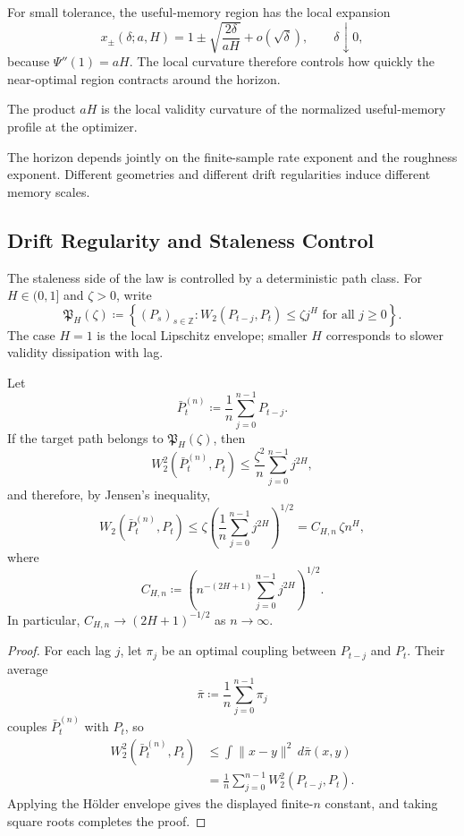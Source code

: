 For small tolerance, the useful-memory region has the local expansion
\[
  x_\pm(\delta;a,H) = 1 \pm \sqrt{\frac{2\delta}{aH}} + o(\sqrt{\delta}),
  \qquad \delta \downarrow 0,
\]
because $\Psi''(1)=aH$. The local curvature therefore controls how quickly the
near-optimal region contracts around the horizon.

The product $aH$ is the local validity curvature of the normalized useful-memory
profile at the optimizer.

The horizon depends jointly on the finite-sample rate exponent and the
roughness exponent. Different geometries and different drift regularities induce
different memory scales.

\subsection{Drift Regularity and Staleness Control}

The staleness side of the law is controlled by a deterministic path class. For
$H\in(0,1]$ and $\zeta>0$, write
\[
  \mathfrak P_H(\zeta)
  \coloneqq
  \left\{(P_s)_{s\in\mathbb Z}: W_2(P_{t-j},P_t) \le \zeta j^H
  \text{ for all } j\ge 0\right\}.
\]
The case $H=1$ is the local Lipschitz envelope; smaller $H$ corresponds to
slower validity dissipation with lag.

\begin{lemma}
\label{lem:holder_staleness_bound}
Let
\[
  \bar P_t^{(n)} \coloneqq \frac{1}{n}\sum_{j=0}^{n-1} P_{t-j}.
\]
If the target path belongs to $\mathfrak P_H(\zeta)$, then
\[
  W_2^2\!\left(\bar P_t^{(n)},P_t\right)
  \le
  \frac{\zeta^2}{n}\sum_{j=0}^{n-1} j^{2H},
\]
and therefore, by Jensen's inequality,
\[
  W_2\!\left(\bar P_t^{(n)},P_t\right)
  \le \zeta\left(\frac{1}{n}\sum_{j=0}^{n-1} j^{2H}\right)^{1/2}
  = C_{H,n}\,\zeta n^H,
\]
where
\[
  C_{H,n}
  \coloneqq
  \left(n^{-(2H+1)}\sum_{j=0}^{n-1} j^{2H}\right)^{1/2}.
\]
In particular, $C_{H,n}\to (2H+1)^{-1/2}$ as $n\to\infty$.
\end{lemma}

\begin{proof}
For each lag $j$, let $\pi_j$ be an optimal coupling between $P_{t-j}$ and $P_t$.
Their average
\[
  \bar \pi \coloneqq \frac{1}{n}\sum_{j=0}^{n-1} \pi_j
\]
couples $\bar P_t^{(n)}$ with $P_t$, so
\[
  \begin{aligned}
  W_2^2\!\left(\bar P_t^{(n)},P_t\right)
  &\le \int \|x-y\|^2\,d\bar\pi(x,y) \\
  &= \frac{1}{n}\sum_{j=0}^{n-1} W_2^2\!\left(P_{t-j},P_t\right).
  \end{aligned}
\]
Applying the Hölder envelope gives the displayed finite-$n$ constant, and taking
square roots completes the proof.
\end{proof}

